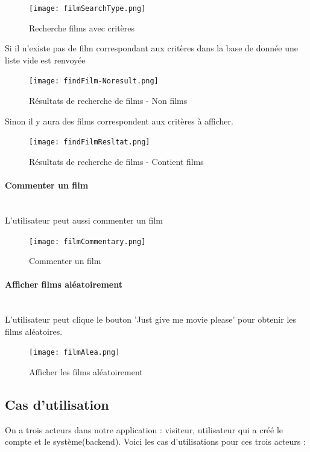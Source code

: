\documentclass[12pt]{article}
\begin{document}
\begin{figure}[H]
    \centering
    \texttt{[image: filmSearchType.png]}
    \caption{Recherche films avec critères}
    \label{fig:App_searchFilmWithCrit}
\end{figure}
Si il n'existe pas de film correspondant aux critères dans la base de donnée une liste vide est renvoyée
\begin{figure}[H]
    \centering
    \texttt{[image: findFilm-Noresult.png]}
    \caption{Résultats de recherche de films - Non films}
    \label{fig:App_searchFilmNoResult}
\end{figure}
Sinon il y aura des films correspondent aux critères à afficher.
\begin{figure}[H]
    \centering
    \texttt{[image: findFilmResltat.png]}
    \caption{Résultats de recherche de films - Contient films}
    \label{fig:App_searchFilmWithResult}
\end{figure}

\paragraph{Commenter un film} 
\leavevmode \\
L'utilisateur peut aussi commenter un film
\begin{figure}[H]
    \centering
    \texttt{[image: filmCommentary.png]}
    \caption{Commenter un film}
    \label{fig:App_ComentaryFilm}
\end{figure}
\paragraph{Afficher films aléatoirement} 
\leavevmode \\
L'utilisateur peut clique le bouton 'Just give me movie please' pour obtenir les films aléatoires.

\begin{figure}[H]
    \centering
    \texttt{[image: filmAlea.png]}
    \caption{Afficher les films aléatoirement}
    \label{fig:App_filmAlea}
\end{figure}

\subsection{Cas d'utilisation}
On a trois acteurs dans notre application : visiteur, utilisateur qui a créé le compte et le système(backend). Voici les cas d'utilisations pour ces trois acteurs : 
\end{document}
